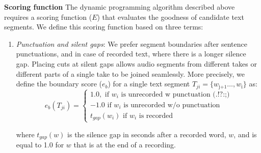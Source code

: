 \textbf{Scoring function}
The dynamic programming algorithm described above requires a
scoring function ($E$) that evaluates the goodness of candidate text segments. We define this scoring function
based on three terms: 
\begin{enumerate}
\item{\textit{Punctuation and silent gaps}: We prefer segment boundaries after sentence punctuations, and in case of recorded text, where there is a longer silence gap. Placing cuts at silent gaps allows audio segments from different takes or different parts of a single take to be joined seamlessly. More precisely, we define the boundary score ($e_b$) for a single text segment $T_{ji} = \{w_\text{j+1}
\dots,w_\text{i}\}$ as:
\begin{equation}
    e_b(T_{ji})= 
\begin{cases}
   1.0, \text{ if } w_i \text{ is unrecorded w punctuation (.!?:;)}\\
   -1.0 \text{ if } w_i \text{ is unrecorded w/o punctuation}\\
   t_{gap}(w_{i}) \text{ if } w_i \text{ is recorded} 
\end{cases}
\end{equation}

where $t_{gap}(w)$ is the silence gap in seconds after a recorded word, $w$, and is equal to 1.0 for $w$ that is at the end of a recording.
  
}


\end{enumerate}
